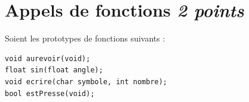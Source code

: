 
\section{Appels de fonctions \hfill \textit{2 points}}

Soient les prototypes de fonctions suivants :
\begin{lstlisting}
void aurevoir(void);
float sin(float angle);
void ecrire(char symbole, int nombre);
bool estPresse(void);
\end{lstlisting}


\espaceReponse{6cm}
